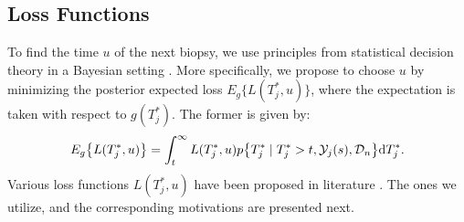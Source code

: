 
\subsection{Loss Functions}
\label{subsec : loss_functions}
To find the time $u$ of the next biopsy, we use principles from statistical decision theory in a Bayesian setting \citep{bergerDecisionTheory,robertBayesianChoice}. More specifically, we propose to choose $u$ by minimizing the posterior expected loss $E_g\big\{L(T^*_j, u)\big\}$, where the expectation is taken with respect to $g(T^*_j)$. The former is given by:
\begin{equation*}
E_g\big\{L(T^*_j, u)\big\} = \int_t^\infty L(T^*_j, u) p\big\{T^*_j \mid T^*_j > t, \mathcal{Y}_j(s), \mathcal{D}_n\big\} \mathrm{d} T^*_j.
\end{equation*}
Various loss functions $L(T^*_j, u)$ have been proposed in literature \citep{robertBayesianChoice}. The ones we utilize, and the corresponding motivations are presented next.

